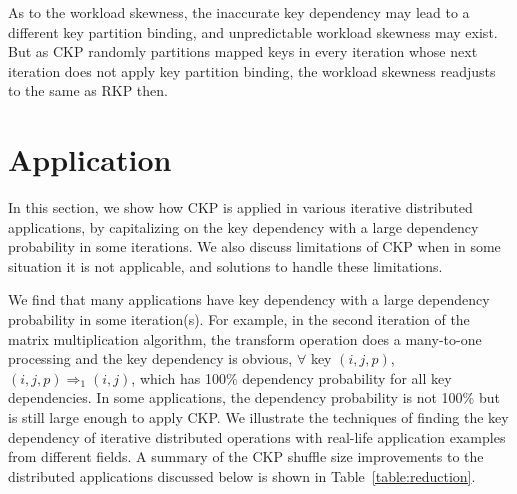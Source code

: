 \documentclass[10pt,journal,compsoc]{IEEEtran}
\begin{document}
As to the workload skewness, the inaccurate key dependency may lead to
a different key partition binding, and unpredictable workload skewness may exist. 
But as CKP randomly partitions mapped keys in every iteration whose next iteration does not apply key partition binding, 
the workload skewness readjusts to the same as RKP then.



\section{Application}\label{section:application}
In this section, we show how CKP is applied in various
iterative distributed applications, by capitalizing on the key dependency 
with a large dependency probability in some iterations. 
We also discuss limitations of CKP when in some situation it is not
applicable, and solutions to handle these limitations.

We find that many applications have key dependency with 
a large dependency probability in some iteration(s).
For example, 
in the second iteration of the matrix multiplication algorithm, 
the transform operation does a many-to-one processing and the key dependency is obvious, 
$\forall$ key $(i,j,p)$, $(i,j,p) \Rightarrow_{1} (i,j)$,
which has 100\% dependency probability for all key dependencies.
In some applications, the dependency probability is not 100\% but 
is still large enough to apply CKP.
We illustrate the techniques of finding the key dependency of iterative
distributed operations with real-life application examples from 
different fields.
A summary of the CKP shuffle size improvements to the distributed applications discussed below is shown in Table~\ref{table:reduction}.
\end{document}
